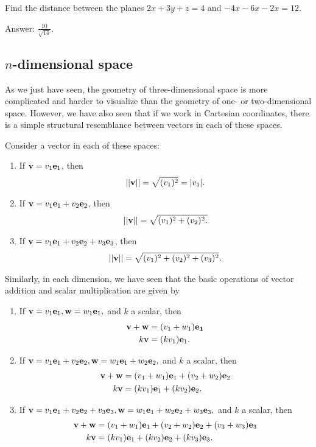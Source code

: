 \documentclass[12pt,letterpaper,reqno]{article}
\numberwithin{equation}{section}
\newcommand{\fixme}[1]{{\color{orange}{[#1]}}}
\begin{document}
\begin{exercise}
Find the distance between the planes $2x+3y+z=4$ and $-4x-6x-2x=12$.	
\end{exercise}

\fixme{Add solution.}

{\color{red} \flushleft Answer: $\frac{10}{\sqrt{14}}$.}



\subsection{$n$-dimensional space}
As we just have seen, the geometry of three-dimensional space is more complicated and harder to visualize than the geometry of one- or two-dimensional space. However, we have also seen that if we work in Cartesian coordinates, there is a simple structural resemblance between vectors in each of these spaces.

Consider a vector in each of these spaces:
\begin{enumerate}[(1)]
	\item If ${\bf v}=v_1{\bf e}_1$, then
		\begin{align*}
			||{\bf v}||=\sqrt{(v_1)^2}=|v_1|.
		\end{align*}
	\item If ${\bf v}=v_1{\bf e}_1+v_2{\bf e}_2$, then
		\begin{align*}
			||{\bf v}||=\sqrt{(v_1)^2+(v_2)^2.}
		\end{align*}
	\item If ${\bf v}=v_1{\bf e}_1+v_2{\bf e}_2+v_3{\bf e}_3$, then
		\begin{align*}
			||{\bf v}||=\sqrt{(v_1)^2+(v_2)^2+(v_3)^2}.
		\end{align*}
\end{enumerate} 
Similarly, in each dimension, we have seen that the basic operations of vector addition and scalar multiplication are given by

\begin{enumerate}[(1)]
	\item If ${\bf v}=v_1{\bf e}_1,{\bf w}=w_1{\bf e}_1,$ and $k$ a scalar, then
	\begin{align*}
		{\bf v}+{\bf w}&=(v_1+w_1){\bf e_1} \\
		k{\bf v}&=(kv_1){\bf e}_1.
	\end{align*}
	\item If ${\bf v}=v_1{\bf e}_1+v_2{\bf e}_2,{\bf w}=w_1{\bf e}_1+w_2{\bf e}_2,$ and $k$ a scalar, then
	\begin{align*}
		{\bf v}+{\bf w}&=(v_1+w_1){\bf e}_1+(v_2+w_2){\bf e}_2 \\
		k{\bf v}&=(kv_1){\bf e}_1+(kv_2){\bf e}_2.
	\end{align*}
	\item If ${\bf v}=v_1{\bf e}_1+v_2{\bf e}_2+v_3{\bf e}_3,{\bf w}=w_1{\bf e}_1+w_2{\bf e}_2+w_3{\bf e}_3,$ and $k$ a scalar, then
	\begin{align*}
		{\bf v}+{\bf w}&=(v_1+w_1){\bf e}_1+(v_2+w_2){\bf e}_2+(v_3+w_3){\bf e}_3 \\
		k{\bf v}&=(kv_1){\bf e}_1+(kv_2){\bf e}_2+(kv_3){\bf e}_3.
	\end{align*}
\end{enumerate}
\end{document}
